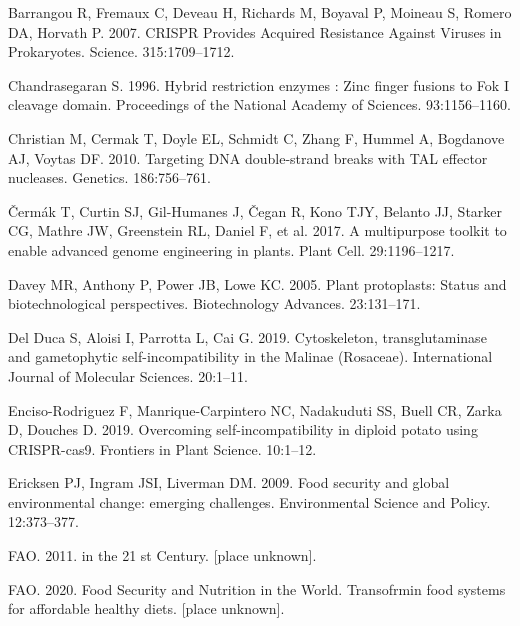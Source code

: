 \documentclass[
]{article}
\newlength{\cslhangindent}
\newenvironment{CSLReferences}[2] %
 {%
  \setlength{\parindent}{0pt}
  \ifodd #1 \everypar{\setlength{\hangindent}{\cslhangindent}}\ignorespaces\fi
  \ifnum #2 > 0
  \setlength{\parskip}{#2\baselineskip}
  \fi
 }%
 {}
\begin{document}
\hypertarget{refs}{}
\begin{CSLReferences}{0}{0}
\leavevmode{}%
Barrangou R, Fremaux C, Deveau H, Richards M, Boyaval P, Moineau S,
Romero DA, Horvath P. 2007. {CRISPR Provides Acquired Resistance Against
Viruses in Prokaryotes}. Science. 315:1709--1712.

\leavevmode{}%
Chandrasegaran S. 1996. {Hybrid restriction enzymes : Zinc finger
fusions to Fok I cleavage domain}. Proceedings of the National Academy
of Sciences. 93:1156--1160.

\leavevmode{}%
Christian M, Cermak T, Doyle EL, Schmidt C, Zhang F, Hummel A, Bogdanove
AJ, Voytas DF. 2010. {Targeting DNA double-strand breaks with TAL
effector nucleases}. Genetics. 186:756--761.

\leavevmode{}%
Čermák T, Curtin SJ, Gil-Humanes J, Čegan R, Kono TJY, Belanto JJ,
Starker CG, Mathre JW, Greenstein RL, Daniel F, et al. 2017. {A
multipurpose toolkit to enable advanced genome engineering in plants}.
Plant Cell. 29:1196--1217.

\leavevmode{}%
Davey MR, Anthony P, Power JB, Lowe KC. 2005. {Plant protoplasts: Status
and biotechnological perspectives}. Biotechnology Advances. 23:131--171.

\leavevmode{}%
Del Duca S, Aloisi I, Parrotta L, Cai G. 2019. {Cytoskeleton,
transglutaminase and gametophytic self-incompatibility in the Malinae
(Rosaceae)}. International Journal of Molecular Sciences. 20:1--11.

\leavevmode{}%
Enciso-Rodriguez F, Manrique-Carpintero NC, Nadakuduti SS, Buell CR,
Zarka D, Douches D. 2019. {Overcoming self-incompatibility in diploid
potato using CRISPR-cas9}. Frontiers in Plant Science. 10:1--12.

\leavevmode{}%
Ericksen PJ, Ingram JSI, Liverman DM. 2009. {Food security and global
environmental change: emerging challenges}. Environmental Science and
Policy. 12:373--377.

\leavevmode{}%
FAO. 2011. {in the 21 st Century}. {[}place unknown{]}.

\leavevmode{}%
FAO. 2020. {Food Security and Nutrition in the World. Transofrmin food
systems for affordable healthy diets}. {[}place unknown{]}.


\end{CSLReferences}
\end{document}
